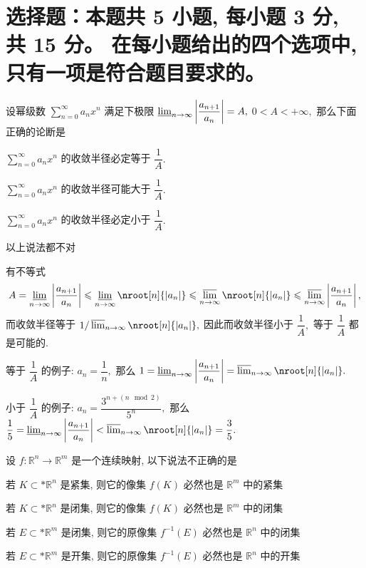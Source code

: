 \fi


\section{%
  选择题：本题共 5 小题, 每小题 3 分, 共 15 分。
  在每小题给出的四个选项中, 只有一项是符合题目要求的。
}


\begin{question}
设幂级数 $\sum\limits_{n=0}^\infty a_n x^n$ 满足下极限 $\varliminf_{n\to\infty} \left\lvert \dfrac{a_{n+1}}{a_n} \right\rvert = A,$ $0 < A < +\infty,$ 那么下面正确的论断是 \paren[D]

\begin{choices}
\item $\sum\limits_{n=0}^\infty a_n x^n$ 的收敛半径必定等于 $\dfrac{1}{A}.$
\item $\sum\limits_{n=0}^\infty a_n x^n$ 的收敛半径可能大于 $\dfrac{1}{A}.$
\item $\sum\limits_{n=0}^\infty a_n x^n$ 的收敛半径必定小于 $\dfrac{1}{A}.$
\item 以上说法都不对
\end{choices}
\end{question}

\begin{solution}
有不等式
\[A = \varliminf_{n\to\infty} \left\lvert \dfrac{a_{n+1}}{a_n} \right\rvert \leqslant \varliminf_{n\to\infty} \nroot[n]{\lvert a_n \rvert} \leqslant \varlimsup_{n\to\infty} \nroot[n]{\lvert a_n \rvert} \leqslant \varlimsup_{n\to\infty}  \left\lvert \dfrac{a_{n+1}}{a_n} \right\rvert,\]
而收敛半径等于 $1 / \varlimsup_{n\to\infty} \nroot[n]{\lvert a_n \rvert},$ 因此而收敛半径小于 $\dfrac{1}{A},$ 等于 $\dfrac{1}{A}$ 都是可能的.

等于 $\dfrac{1}{A}$ 的例子: $a_n = \dfrac{1}{n},$ 那么 $1 = \varliminf_{n\to\infty} \left\lvert \dfrac{a_{n+1}}{a_n} \right\rvert = \varlimsup_{n\to\infty} \nroot[n]{\lvert a_n \rvert}.$

小于 $\dfrac{1}{A}$ 的例子: $a_n = \dfrac{3^{n + (n \mod 2)}}{5^n},$ 那么 $\dfrac{1}{5} = \varliminf_{n\to\infty} \left\lvert \dfrac{a_{n+1}}{a_n} \right\rvert < \varlimsup_{n\to\infty} \nroot[n]{\lvert a_n \rvert} = \dfrac{3}{5}.$
\end{solution}

\begin{question}
设 $f: \mathbb{R}^n \to \mathbb{R}^m$ 是一个连续映射, 以下说法不正确的是 \paren[B]

\begin{choices}
\item 若 $K \subset* \mathbb{R}^n$ 是紧集, 则它的像集 $f(K)$ 必然也是 $\mathbb{R}^m$ 中的紧集
\item 若 $K \subset* \mathbb{R}^n$ 是闭集, 则它的像集 $f(K)$ 必然也是 $\mathbb{R}^m$ 中的闭集
\item 若 $E \subset* \mathbb{R}^m$ 是闭集, 则它的原像集 $f^{-1}(E)$ 必然也是 $\mathbb{R}^n$ 中的闭集
\item 若 $E \subset* \mathbb{R}^m$ 是开集, 则它的原像集 $f^{-1}(E)$ 必然也是 $\mathbb{R}^n$ 中的开集
\end{choices}
\end{question}

